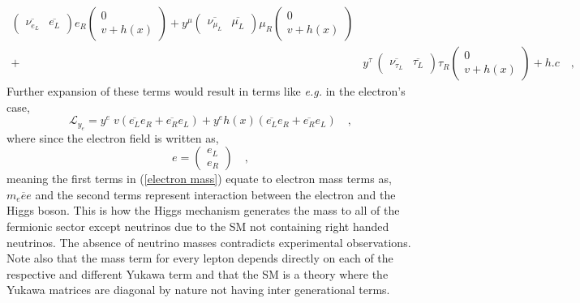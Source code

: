 \begin{align}
\begin{pmatrix}
\overline{\nu_{e_L}} & \overline{e_L} 
\end{pmatrix} e_R 
\begin{pmatrix}
0 \\ v + h(x)
\end{pmatrix} +
 y^\mu 
\begin{pmatrix}
\overline{\nu_{\mu_L}} & \overline{\mu_L} 
\end{pmatrix} \mu_R
\begin{pmatrix}
0 \\ v + h(x)
\end{pmatrix} \nonumber  \\  + & 
 y^\tau \
\begin{pmatrix}
\overline{\nu_{\tau_L}} & \overline{\tau_L} 
\end{pmatrix} \tau_R 
\begin{pmatrix}
0 \\ v + h(x)
\end{pmatrix} +  h.c  \nonumber \quad , 
\end{align}
%
Further expansion of these terms would result in terms like \textit{e.g.} in the electron's case,  
%
\begin{equation}
\mathcal{L}_{y_e} = y^e \; v \left( \overline{e_L} e_R + \overline{e_R} e_L \right) +  y^e h(x) \left( \overline{e_L} e_R + \overline{e_R} e_L \right) \quad , 
\label{electron mass}
\end{equation}
%
where since the electron field is written as, 
% 
\begin{equation}
e=\begin{pmatrix}
e_L \\
e_R 
\end{pmatrix} \quad , 
\end{equation}
%
meaning the first terms in (\ref{electron mass}) equate to electron mass terms as, $m_e \overline{e} e $ and the second terms represent interaction between the electron and the Higgs boson.  
%
This is how the Higgs mechanism generates the mass to all of the fermionic sector except neutrinos due to the SM not containing right handed neutrinos. The absence of neutrino masses contradicts experimental observations.
%
Note also that the mass term for every lepton depends directly on each of the respective and different Yukawa term and that the SM is a theory where the Yukawa matrices are diagonal by nature not having inter generational terms.
 